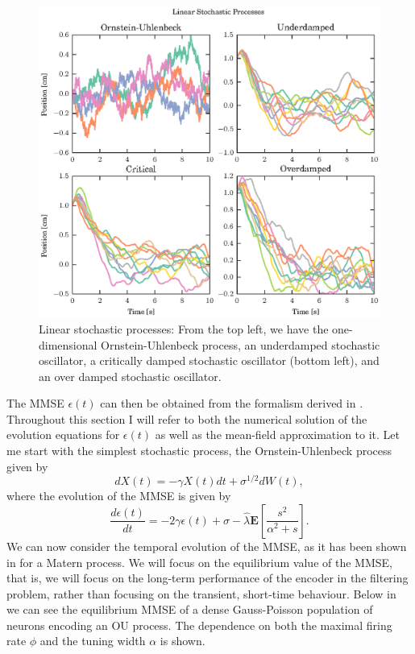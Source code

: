 \begin{figure}
\label{fig:filtering_expl}
\includegraphics[width=\columnwidth]{figures/figure_5_2.eps}
\caption{Linear stochastic processes: From the top left, we have the one-dimensional Ornstein-Uhlenbeck process, an underdamped stochastic oscillator,
a critically damped stochastic oscillator (bottom left), and an over damped stochastic oscillator.}
\end{figure}


The MMSE $\epsilon(t)$ can then be obtained from the formalism derived in . Throughout this section I will refer to both the numerical solution of the
evolution equations for $\epsilon(t)$ as well as the mean-field approximation to it. Let me start with the simplest stochastic process, the Ornstein-Uhlenbeck process
given by
\[
dX(t) = -\gamma X(t) dt + \sigma^{1/2} dW(t),
\]
where the evolution of the MMSE is given by
\[
\frac{d\epsilon(t)}{dt} = -2\gamma \epsilon(t) + \sigma -\hat{\lambda} \boldsymbol{E}\left[\frac{s^2}{\alpha^2+s}\right].
\]
We can now consider the temporal evolution of the MMSE, as it has been shown in  for a Matern process. 
We will focus on the equilibrium value of the MMSE, that is, we will focus on the long-term performance of the encoder in the filtering problem, rather than focusing
on the transient, short-time behaviour. Below in  we can see the equilibrium MMSE of a dense Gauss-Poisson population of neurons encoding
an OU process. The dependence on both the maximal firing rate $\phi$ and the tuning width $\alpha$ is shown.


